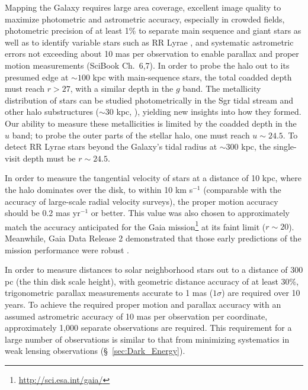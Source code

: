 Mapping the Galaxy requires large area coverage, excellent image
quality to maximize photometric and astrometric accuracy,
especially in crowded fields, photometric precision of at least 1\% to
separate main sequence and
giant stars \cite[e.g.,][]{2003ApJ...586..195H} as well as to identify variable
stars such as RR Lyrae \citep{2010ApJ...708..717S,2011ApJ...728..106S},
and systematic astrometric errors not exceeding about 10 mas per observation to enable parallax and proper motion measurements
(SciBook Ch.~6,7). In order to probe the halo out to its presumed edge at $\sim100$ kpc \citep{2004ASPC..327..104I}
with main-sequence stars, the total coadded depth must reach $r > 27$, with a similar depth in the $g$ band.
The metallicity distribution of stars can be studied photometrically in the Sgr tidal stream
\cite[e.g., see][]{2003ApJ...599.1082M,2007ApJ...670..346C} and other halo substructures
($\sim 30$ kpc, \citealt{2007Natur.450.1020C}), yielding new insights into how
they formed.  Our ability to measure these metallicities is limited by
the coadded depth in the $u$ band; to probe the outer parts of the
stellar halo, one must reach
$u\sim24.5$. To detect RR Lyrae stars beyond the Galaxy's tidal radius at $\sim 300$ kpc, the single-visit depth must
be $r \sim  24.5$.

In order to measure the tangential velocity of stars at a distance of 10 kpc, where the halo dominates over the disk, to
within 10 km s$^{-1}$ (comparable with the accuracy of large-scale radial velocity surveys), the proper motion
accuracy should be 0.2 mas yr$^{-1}$ or better. This value was also chosen to approximately match the accuracy 
anticipated for the Gaia mission\footnote{\url{http://sci.esa.int/gaia/}} \citep{2001A&A...369..339P,2012Ap&SS.341...31D} 
at its faint limit ($r \sim 20$). Meanwhile,  Gaia Data Release 2 demonstrated that those 
early predictions of the mission performance were robust \citep{2018A&A...616A...1G,2018A&A...616A...2L}.

In order to measure distances to solar neighborhood stars out to a distance of 300 pc (the thin disk scale height),
with geometric distance accuracy of at least 30\%, trigonometric parallax measurements accurate to 1 mas ($1\sigma$)
are required over 10 years. To achieve the required proper motion and parallax accuracy with an assumed astrometric
accuracy of 10 mas per observation per coordinate, approximately 1,000
separate observations are required. This requirement for a large
number of observations is similar to that from minimizing
systematics in weak lensing observations (\S~\ref{sec:Dark_Energy}).


